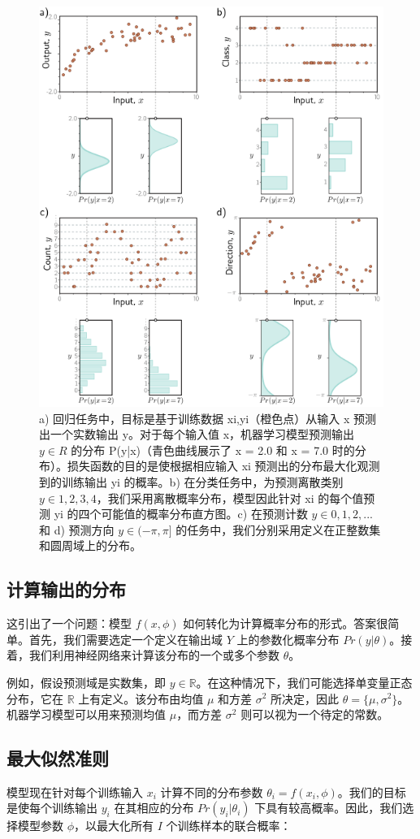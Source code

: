 \begin{figure}[ht!]
	\centering
	\includegraphics[width=0.7\linewidth]{png/chapter5/LossDataTypes.png}
	\caption{a) 回归任务中，目标是基于训练数据 {xi,yi}（橙色点）从输入 x 预测出一个实数输出 y。对于每个输入值 x，机器学习模型预测输出 \(y \in R\) 的分布 P(y|x)（青色曲线展示了 x = 2.0 和 x = 7.0 时的分布）。损失函数的目的是使根据相应输入 xi 预测出的分布最大化观测到的训练输出 yi 的概率。b) 在分类任务中，为预测离散类别 \(y \in {1, 2, 3, 4}\)，我们采用离散概率分布，模型因此针对 xi 的每个值预测 yi 的四个可能值的概率分布直方图。c) 在预测计数 \(y \in {0, 1, 2, ...}\) 和 d) 预测方向 \(y \in (−\pi, \pi]\) 的任务中，我们分别采用定义在正整数集和圆周域上的分布。}
\end{figure}


\subsection{计算输出的分布}
这引出了一个问题：模型 \(f(x, \phi)\) 如何转化为计算概率分布的形式。答案很简单。首先，我们需要选定一个定义在输出域 \(Y\) 上的参数化概率分布 \(Pr(y|\theta)\)。接着，我们利用神经网络来计算该分布的一个或多个参数 \(\theta\)。

例如，假设预测域是实数集，即 \(y \in \mathbb{R}\)。在这种情况下，我们可能选择单变量正态分布，它在 \(\mathbb{R}\) 上有定义。该分布由均值 \(\mu\) 和方差 \(\sigma^2\) 所决定，因此 \(\theta = \{\mu, \sigma^2\}\)。机器学习模型可以用来预测均值 \(\mu\)，而方差 \(\sigma^2\) 则可以视为一个待定的常数。
\subsection{最大似然准则}
模型现在针对每个训练输入 \(x_i\) 计算不同的分布参数 \(\theta_i = f(x_i, \phi)\)。我们的目标是使每个训练输出 \(y_i\) 在其相应的分布 \(Pr(y_i|\theta_i)\) 下具有较高概率。因此，我们选择模型参数 \(\phi\)，以最大化所有 \(I\) 个训练样本的联合概率：

